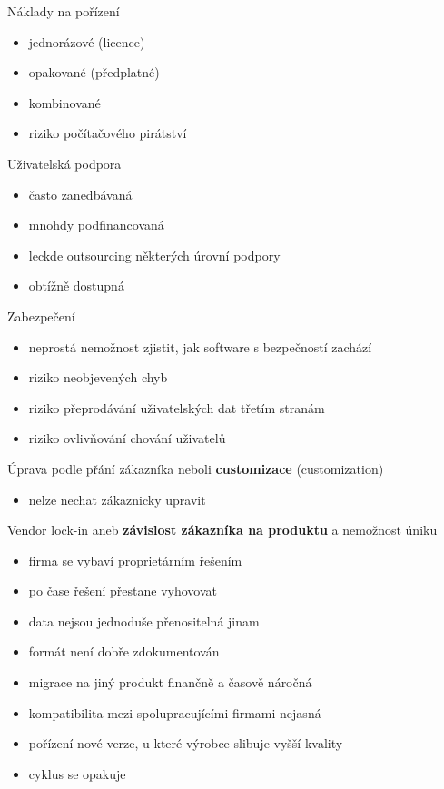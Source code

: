 \documentclass[11pt]{beamer}
\begin{document}
\begin{frame}{Náklady na pořízení}
	\begin{itemize}
		\item jednorázové (licence)
		\item opakované (předplatné)
		\item kombinované
		\item riziko počítačového pirátství
	\end{itemize}
\end{frame}

\begin{frame}{Uživatelská podpora}
	\begin{itemize}
		\item často zanedbávaná
		\item mnohdy podfinancovaná
		\item leckde outsourcing některých úrovní podpory
		\item obtížně dostupná
	\end{itemize}
\end{frame}

\begin{frame}{Zabezpečení}
	\begin{itemize}
		\item neprostá nemožnost zjistit, jak software s bezpečností zachází
		\item riziko neobjevených chyb
		\item riziko přeprodávání uživatelských dat třetím stranám
		\item riziko ovlivňování chování uživatelů
	\end{itemize}
\end{frame}

\begin{frame}{Úprava podle přání zákazníka}
	neboli \textbf{customizace} (customization)
	\begin{itemize}
		\item nelze nechat zákaznicky upravit
	\end{itemize}
\end{frame}

\begin{frame}{Vendor lock-in}
	aneb \textbf{závislost zákazníka na produktu} a nemožnost úniku
	
	\begin{itemize}
		\item firma se vybaví proprietárním řešením
		\item po čase řešení přestane vyhovovat
		\item data nejsou jednoduše přenositelná jinam
		\item formát není dobře zdokumentován
		\item migrace na jiný produkt finančně a časově náročná
		\item kompatibilita mezi spolupracujícími firmami nejasná
		\item pořízení nové verze, u které výrobce slibuje vyšší kvality
		\item cyklus se opakuje
	\end{itemize}
\end{frame}
\end{document}
